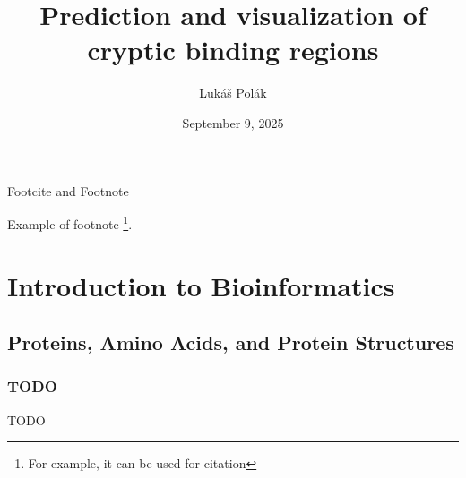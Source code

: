 \documentclass[aspectratio=169]{beamer}
\title[PredictionAndVisualization]{Prediction and visualization of cryptic binding regions}
\author[Polak L.]{Lukáš Polák}
\institute[CUNI]{Faculty of Mathematics and Physics, Charles University}
\date{September 9, 2025}
\begin{document}


\begin{frame}[plain]
  \titlepage
\end{frame}





\begin{frame}{Footcite and Footnote}

  Example of footnote \footnote{For example, it can be used for citation}.

\end{frame}

\section{Introduction to Bioinformatics}

\subsection{Proteins, Amino Acids, and Protein Structures}

\begin{frame}
  \frametitle{TODO}
  \alert{TODO}

\end{frame}
\end{document}
